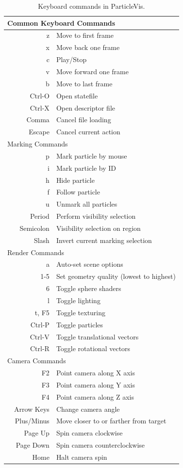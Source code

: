 \begin{table}
\centering
\caption[Keyboard commands in ParticleVis]{Keyboard commands in ParticleVis.}
\label{keyboard-shortcuts}
\begin{scriptsize}
\begin{tabular}[t]{|c r|l|}
\hline \multicolumn{3}{|l|}{Common Keyboard Commands}\\ \hline
	& z & Move to first frame\\
	& x & Move back one frame\\
	& c & Play/Stop\\
	& v & Move forward one frame\\
	& b & Move to last frame\\
	& Ctrl-O & Open statefile\\
	& Ctrl-X & Open descriptor file\\
	& Comma & Cancel file loading\\
	& Escape & Cancel current action\\		
 \hline \multicolumn{3}{|l|}{Marking Commands}\\ \hline
	& p & Mark particle by mouse\\
	& i & Mark particle by ID\\
	& h & Hide particle\\
	& f & Follow particle\\
	& u & Unmark all particles \\
	& Period & Perform visibility selection\\
	& Semicolon & Visibility selection on region\\
	& Slash & Invert current marking selection\\	
\hline \multicolumn{3}{|l|}{Render Commands}\\ \hline
	& a & Auto-set scene options\\
	& 1-5 & Set geometry quality (lowest to highest)\\
	& 6 & Toggle sphere shaders\\
	& l & Toggle lighting\\
	& t, F5 & Toggle texturing\\
	& Ctrl-P & Toggle particles\\
	& Ctrl-V & Toggle translational vectors\\
	& Ctrl-R & Toggle rotational vectors\\
\hline \multicolumn{3}{|l|}{Camera Commands}\\ \hline
	& F2 & Point camera along X axis\\
	& F3 & Point camera along Y axis\\
	& F4 & Point camera along Z axis\\
	& Arrow Keys & Change camera angle \\
	& Plus/Minus & Move closer to or farther from target\\
	& Page Up & Spin camera clockwise \\
	& Page Down & Spin camera counterclockwise \\
	& Home & Halt camera spin \\ \hline	 	
\end{tabular}
\end{scriptsize}
\end{table}

